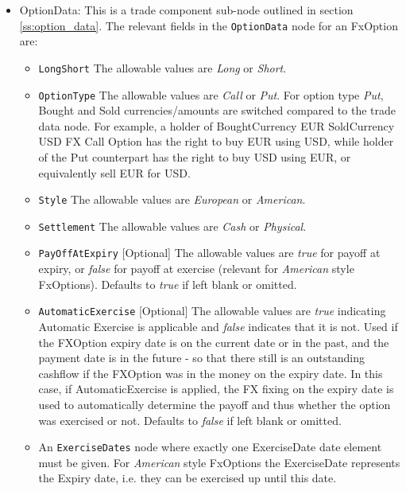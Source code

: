 \begin{itemize}
\item OptionData: This is a trade component sub-node outlined in section \ref{ss:option_data}. 
The relevant fields in the \lstinline!OptionData! node for an FxOption are:

\begin{itemize}
\item \lstinline!LongShort! The allowable values are \emph{Long} or \emph{Short}.

\item \lstinline!OptionType! The allowable values are \emph{Call} or \emph{Put}. For option type \emph{Put}, Bought and Sold currencies/amounts are switched compared to the trade data node.
For example, a holder of BoughtCurrency EUR SoldCurrency USD FX Call Option has the right to buy EUR using USD, while
holder of the Put counterpart has the right to buy USD using EUR, or equivalently sell EUR for USD.

\item  \lstinline!Style! The allowable values are \emph{European} or \emph{American}.

\item  \lstinline!Settlement! The allowable values are \emph{Cash} or \emph{Physical}.

\item \lstinline!PayOffAtExpiry! [Optional] The allowable values are \emph{true} for payoff at expiry, or \emph{false} for payoff at exercise (relevant for \emph{American} style FxOptions). Defaults to \emph{true} if left blank or omitted.

\item \lstinline!AutomaticExercise! [Optional] The allowable values are \emph{true} indicating Automatic Exercise is applicable and  \emph{false} indicates that it is not. Used if the FXOption expiry date is on the current
date or in the past, and the payment date is in the future - so that there still is
an outstanding cashflow if the FXOption was in the money on the expiry date. In
this case, if AutomaticExercise is applied, the FX fixing
on the expiry date is used to automatically determine the payoff and thus
whether the option was exercised or not. Defaults to \emph{false} if left blank or omitted.

\item An \lstinline!ExerciseDates! node where exactly one ExerciseDate date element must be given. For \emph{American} style FxOptions the ExerciseDate represents the Expiry date, i.e. they can be exercised up until this date. \\


\end{itemize}
\end{itemize}
